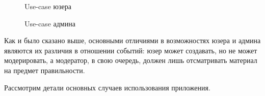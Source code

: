\documentclass[diploma]{SCWorks}
\begin{document}
\begin{figure}[H]
	\caption{Use-case юзера}
	\label{pic:use-case_user}
\end{figure}

\begin{figure}[H]
	\caption{Use-case админа}
	\label{pic:use-case_admin}
\end{figure}

Как и было сказано выше, основными отличиями в возможностях юзера и админа 
являются их различия в отношении событий: юзер может создавать, но не может 
модерировать, а модератор, в свою очередь, должен лишь отсматривать материал
на предмет правильности.

Рассмотрим детали основных случаев использования приложения.
\end{document}
